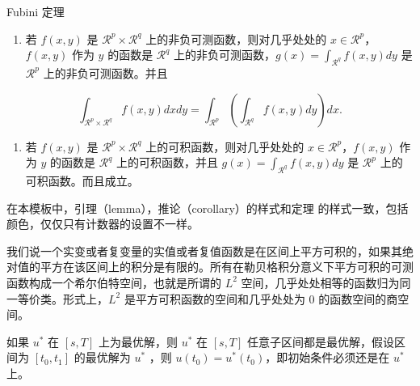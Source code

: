 \documentclass[cn,11pt,fancy,hide]{elegantbook}
\providecommand{\tightlist}{%
  \setlength{\itemsep}{0pt}\setlength{\parskip}{0pt}}
\begin{document}
\begin{shaded}

Fubini 定理

\begin{enumerate}
\def\labelenumi{\arabic{enumi}.}
\tightlist
\item
  若 \(f(x,y)\) 是 \(\mathcal{R}^p\times\mathcal{R}^q\) 上的非负可测函数，则对几乎处处的 \(x\in \mathcal{R}^p\)，\(f(x,y)\) 作为 \(y\) 的函数是 \(\mathcal{R}^q\) 上的非负可测函数，\(g(x)=\int_{\mathcal{R}^q}f(x,y) dy\) 是 \(\mathcal{R}^p\) 上的非负可测函数。并且
\end{enumerate}

\begin{equation}
     \int_{\mathcal{R}^p\times\mathcal{R}^q} f(x,y) dxdy=\int_{\mathcal{R}^p}\left(\int_{\mathcal{R}^q}f(x,y)dy\right)dx.
  \end{equation}

\begin{enumerate}
\def\labelenumi{\arabic{enumi}.}
\tightlist
\item
  若 \(f(x,y)\) 是 \(\mathcal{R}^p\times\mathcal{R}^q\) 上的可积函数，则对几乎处处的 \(x\in\mathcal{R}^p\)，\(f(x,y)\) 作为 \(y\) 的函数是 \(\mathcal{R}^q\) 上的可积函数，并且 \(g(x)=\int_{\mathcal{R}^q}f(x,y) dy\) 是 \(\mathcal{R}^p\) 上的可积函数。而且成立。
\end{enumerate}

\end{shaded}

\begin{note}

在本模板中，引理（lemma），推论（corollary）的样式和定理 的样式一致，包括颜色，仅仅只有计数器的设置不一样。

\end{note}

我们说一个实变或者复变量的实值或者复值函数是在区间上平方可积的，如果其绝对值的平方在该区间上的积分是有限的。所有在勒贝格积分意义下平方可积的可测函数构成一个希尔伯特空间，也就是所谓的 \(L^2\) 空间，几乎处处相等的函数归为同一等价类。形式上，\(L^2\) 是平方可积函数的空间和几乎处处为 0 的函数空间的商空间。

\begin{description}
\tightlist
\item[最优性原理]
如果 \(u^*\) 在 \([s,T]\) 上为最优解，则 \(u^*\) 在 \([s, T]\) 任意子区间都是最优解，假设区间为 \([t_0, t_1]\) 的最优解为 \(u^*\) ，则 \(u(t_0)=u^{*}(t_0)\)，即初始条件必须还是在 \(u^*\) 上。
\end{description}
\end{document}
